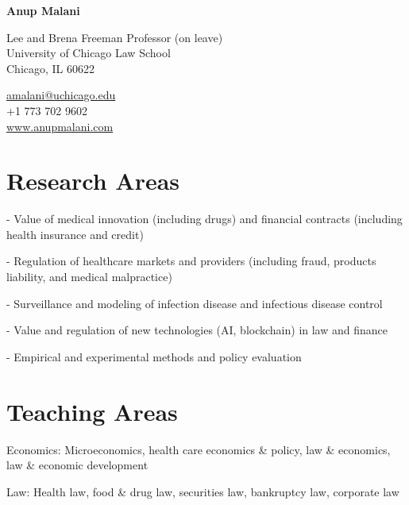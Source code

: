 \documentclass[11pt,letterpaper]{report}
\newcommand{\myname}{Anup Malani}
\newcommand{\namefont}[1]{{\normalfont\bfseries\Huge{#1}}}
\newcommand{\listitemspace}{0.25em}
\renewenvironment{itemize}
{\begin{list}{}{\setlength{\leftmargin}{0em}
                \setlength{\parskip}{0em}
                \setlength{\itemsep}{\listitemspace}
                \setlength{\parsep}{\listitemspace}}}
{\end{list}}
\begin{document}
    \raggedright{}

    \namefont{\myname}

    \vspace{1em}
    \begin{minipage}[t]{0.700\textwidth}
        Lee and Brena Freeman Professor (on leave) \\
        University of Chicago Law School \\
        Chicago, IL 60622 
    \end{minipage}
    \begin{minipage}[t]{0.295\textwidth}
        \flushright{}
        \href{mailto:amalani@uchicago.edu}{amalani@uchicago.edu} \\
        +1 773 702 9602 \\
        \href{https://www.anupmalani.com}{www.anupmalani.com}
    \end{minipage}


    \section*{Research Areas}

    \begin{itemize}

        \item - Value of medical innovation (including drugs) and financial contracts (including health insurance and credit)
        \item - Regulation of healthcare markets and providers (including fraud, products liability, and medical malpractice)
        \item - Surveillance and modeling of infection disease and infectious disease control 
        \item - Value and regulation of new technologies (AI, blockchain) in law and finance
        \item - Empirical and experimental methods and policy evaluation 

    \end{itemize}
    
    \section*{Teaching Areas}

    \begin{itemize}

        \item Economics: Microeconomics, health care economics \& policy, law \& economics, law \& economic development
        \item Law: Health law, food \& drug law, securities law, bankruptcy law, corporate law

    \end{itemize}
\end{document}
